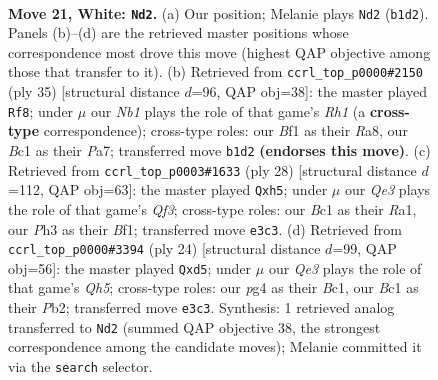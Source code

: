 \documentclass[11pt]{article}
\begin{document}
\clearpage

\begin{figure}[p]\centering
\begin{subfigure}{0.46\textwidth}\centering
\resizebox{\linewidth}{!}{%
\newchessgame
\chessboard[
  setfen={r3k2r/5p2/b4n2/p2pp3/1b1q2pp/4Q2P/PP3PP1/RNB1KB1R w kq - 4 21},
  showmover=false,
  pgfstyle=straightmove, color=movearrow, markmove={b1-d2}
]}
\caption{}
\end{subfigure}\hfill
\begin{subfigure}{0.46\textwidth}\centering
\resizebox{\linewidth}{!}{%
\newchessgame
\chessboard[
  setfen={r3k2r/p1pn3p/q3p1p1/1bb3P1/1p1BP1Q1/1B3N2/PPP4P/R3K2R b KQkq - 5 18},
  showmover=false,
  pgfstyle=straightmove, color=movearrow, markmove={h8-f8}
]}
\caption{}
\end{subfigure}
\\[4pt]
\begin{subfigure}{0.46\textwidth}\centering
\resizebox{\linewidth}{!}{%
\newchessgame
\chessboard[
  setfen={r1b2rk1/pp2bpp1/2n5/q2p2Pp/3N3P/2P1BQ2/PP3P2/R3KBR1 w Q - 0 15},
  showmover=false,
  pgfstyle=straightmove, color=movearrow, markmove={f3-h5}
]}
\caption{}
\end{subfigure}\hfill
\begin{subfigure}{0.46\textwidth}\centering
\resizebox{\linewidth}{!}{%
\newchessgame
\chessboard[
  setfen={r1b1r1k1/ppp1np1p/5p2/3q3Q/1b1Np3/4P3/PP1PBPPP/R1B1K2R w KQ - 0 13},
  showmover=false,
  pgfstyle=straightmove, color=movearrow, markmove={h5-d5}
]}
\caption{}
\end{subfigure}
\caption{\textbf{Move 21, White: \texttt{Nd2}.} (a) Our position; Melanie plays \texttt{Nd2} (\texttt{b1d2}). Panels (b)--(d) are the retrieved master positions whose correspondence most drove this move (highest QAP objective among those that transfer to it). (b) Retrieved from \texttt{ccrl\_top\_p0000\#2150} (ply 35) [structural distance $d$=96, QAP obj=38]: the master played \texttt{Rf8}; under $\mu$ our \emph{Nb1} plays the role of that game's \emph{Rh1} (a \textbf{cross-type} correspondence); cross-type roles: our \emph{B}f1 as their \emph{R}a8, our \emph{B}c1 as their \emph{P}a7; transferred move \texttt{b1d2} \textbf{(endorses this move)}. (c) Retrieved from \texttt{ccrl\_top\_p0003\#1633} (ply 28) [structural distance $d$=112, QAP obj=63]: the master played \texttt{Qxh5}; under $\mu$ our \emph{Qe3} plays the role of that game's \emph{Qf3}; cross-type roles: our \emph{B}c1 as their \emph{R}a1, our \emph{P}h3 as their \emph{B}f1; transferred move \texttt{e3c3}. (d) Retrieved from \texttt{ccrl\_top\_p0000\#3394} (ply 24) [structural distance $d$=99, QAP obj=56]: the master played \texttt{Qxd5}; under $\mu$ our \emph{Qe3} plays the role of that game's \emph{Qh5}; cross-type roles: our \emph{p}g4 as their \emph{B}c1, our \emph{B}c1 as their \emph{P}b2; transferred move \texttt{e3c3}. Synthesis: 1 retrieved analog transferred to \texttt{Nd2} (summed QAP objective 38, the strongest correspondence among the candidate moves); Melanie committed it via the \texttt{search} selector.}
\label{fig:thought-m40}
\end{figure}
\end{document}
